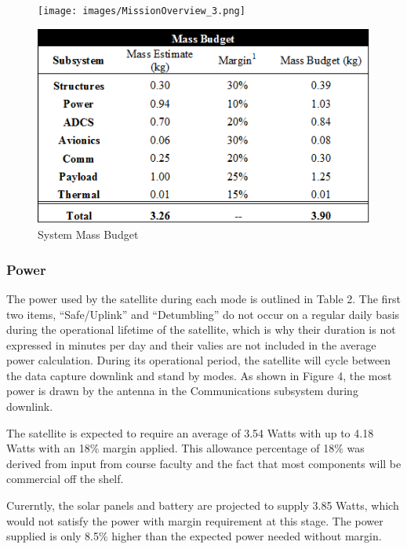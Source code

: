 \documentclass[12pt]{article}
\begin{document}
			\begin{figure}[!ht]
				\centering
				\texttt{[image: images/MissionOverview\_3.png]}
				
				\includegraphics[width=5in]{images/MissionOverview_5.png}
				\caption{System Mass Budget}
				\label{fig:Mission_mass2}
			\end{figure}
			
		\subsubsection{Power}
		The power used by the satellite during each mode is outlined in Table 2. The first two items, “Safe/Uplink” and “Detumbling” do not occur on a regular daily basis during the operational lifetime of the satellite, which is why their duration is not expressed in minutes per day and their valies are not included in the average power calculation. 
During its operational period, the satellite will cycle between the data capture downlink and stand by modes. As shown in Figure 4, the most power is drawn by the antenna in the Communications subsystem during downlink. 

The satellite is expected to require an average of 3.54 Watts with up to 4.18 Watts with an 18\% margin applied. This allowance percentage of 18\% was derived from input from course faculty and the fact that most components will be commercial off the shelf. 

Curerntly, the solar panels and battery are projected to supply 3.85 Watts, which would not satisfy the power with margin requirement at this stage. The power supplied is only 8.5\% higher than the expected power needed without margin.
\end{document}
